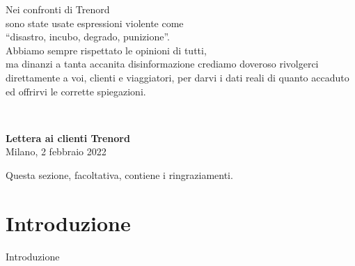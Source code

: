 \documentclass[12pt,italian]{report}
\begin{document}
	
	\frontespizio
	\beforepreface
	
	\hfill
	\begin{minipage}{15cm}
		\hfill
		\begin{minipage}[t]{11cm}
			\raggedleft \large
			{
				\sl
				
				Nei confronti di Trenord \\
				sono state usate espressioni violente come \\
				``disastro, incubo, degrado, punizione''. \\
				\bigskip
				Abbiamo sempre rispettato le opinioni di tutti,\\
				ma dinanzi a tanta accanita disinformazione crediamo doveroso rivolgerci direttamente a voi, clienti e viaggiatori, per darvi i dati reali di quanto accaduto ed offrirvi le corrette spiegazioni.
				
				\bigskip
			}
		\end{minipage} \\
			\raggedleft \large
			
			\textbf{Lettera ai clienti Trenord} \\
			Milano, 2 febbraio 2022
	\end{minipage}
	
	Questa sezione, facoltativa, contiene i ringraziamenti.
	
	\afterpreface
	
	\chapter{Introduzione}
	\label{cap:introduzione}
	
	Introduzione
	
	
	
\end{document}
